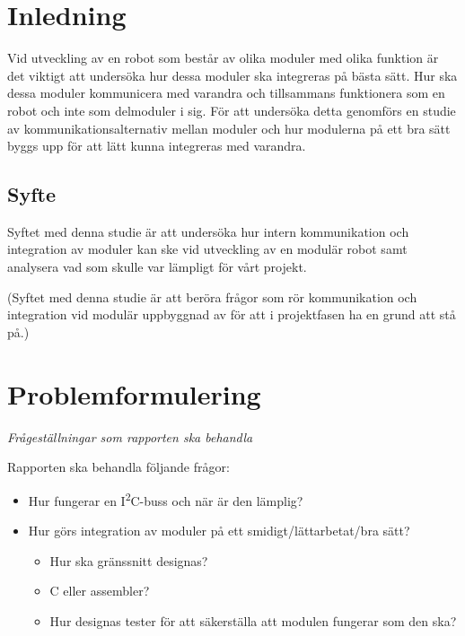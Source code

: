 \documentclass[11pt]{article}
\begin{document}
\begin{flushleft}

\section{Inledning}
Vid utveckling av en robot som består av olika moduler med olika funktion är det viktigt att undersöka hur dessa moduler ska integreras på bästa sätt. Hur ska dessa moduler kommunicera med varandra och tillsammans funktionera som en robot och inte som delmoduler i sig. För att undersöka detta genomförs en studie av kommunikationsalternativ mellan moduler och hur modulerna på ett bra sätt byggs upp för att lätt kunna integreras med varandra. 

\subsection{Syfte}
Syftet med denna studie är att undersöka hur intern kommunikation och integration av moduler kan ske vid utveckling av en modulär robot samt analysera vad som skulle var lämpligt för vårt projekt.

(Syftet med denna studie är att beröra frågor som rör kommunikation och integration vid modulär uppbyggnad av  för att i projektfasen ha en grund att stå på.)

\pagebreak

\section{Problemformulering}
\textit{Frågeställningar som rapporten ska behandla}

Rapporten ska behandla följande frågor:

\begin{itemize}
	\item Hur fungerar en I\textsuperscript{2}C-buss och när är den lämplig?
	\item Hur görs integration av moduler på ett smidigt/lättarbetat/bra sätt?
	
		\begin{itemize}
			\item Hur ska gränssnitt designas?
			\item C eller assembler?
			\item Hur designas tester för att säkerställa att modulen fungerar som den ska?
		\end{itemize}

\end{itemize}


\end{flushleft}
\end{document}
